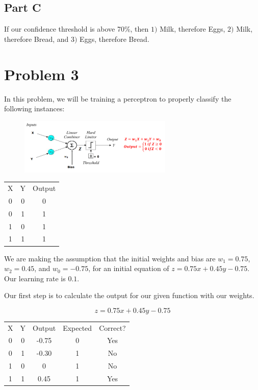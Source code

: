 \documentclass{article}
\begin{document}
\subsection*{Part C}

If our confidence threshold is above 70\%, then $1)$ Milk, therefore Eggs, $2)$ Milk, therefore Bread, and $3)$ Eggs, therefore Bread.

\section*{Problem 3}

In this problem, we will be training a perceptron to properly classify the following instances:


\begin{figure}[H]
    \centering
    \includegraphics[width = 0.65\textwidth]{imgs/perceptron.png}
\end{figure}

\begin{center}
    \begin{tabular}{c c c}
        X & Y & Output\\
        0 & 0 & 0\\
        0 & 1 & 1\\
        1 & 0 & 1\\
        1 & 1 & 1\\
    \end{tabular}
\end{center}

We are making the assumption that the initial weights and bias are $w_1=0.75$, $w_2=0.45$, and $w_0=-0.75$, for an initial equation of $z = 0.75x + 0.45y - 0.75$. Our learning rate is $0.1$.

Our first step is to calculate the output for our given function with our weights.

\begin{equation}
    z=0.75x+0.45y-0.75
\end{equation}

\begin{center}
    \begin{tabular}{c c c c c}
        X & Y & Output & Expected & Correct?\\
        0 & 0 & -0.75 & 0 & Yes\\
        0 & 1 & -0.30 & 1 & No\\
        1 & 0 & 0 & 1 & No\\
        1 & 1 & 0.45 & 1 & Yes\\
    \end{tabular}
\end{center}
\end{document}
